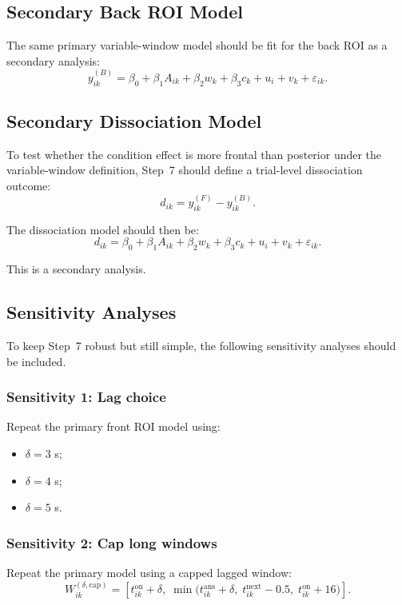 \subsection{Secondary Back ROI Model}
The same primary variable-window model should be fit for the back ROI as a secondary analysis:
\begin{equation}
y^{(B)}_{ik}
=
\beta_0
+
\beta_1 A_{ik}
+
\beta_2 w_k
+
\beta_3 c_k
+
u_i
+
v_k
+
\varepsilon_{ik}.
\end{equation}

\subsection{Secondary Dissociation Model}
To test whether the condition effect is more frontal than posterior under the variable-window definition,
Step~7 should define a trial-level dissociation outcome:
\begin{equation}
d_{ik} = y^{(F)}_{ik} - y^{(B)}_{ik}.
\end{equation}

The dissociation model should then be:
\begin{equation}
d_{ik}
=
\beta_0
+
\beta_1 A_{ik}
+
\beta_2 w_k
+
\beta_3 c_k
+
u_i
+
v_k
+
\varepsilon_{ik}.
\end{equation}

This is a secondary analysis.

\subsection{Sensitivity Analyses}
To keep Step~7 robust but still simple, the following sensitivity analyses should be included.

\subsubsection{Sensitivity 1: Lag choice}
Repeat the primary front ROI model using:
\begin{itemize}
    \item \(\delta = 3\) s;
    \item \(\delta = 4\) s;
    \item \(\delta = 5\) s.
\end{itemize}

\subsubsection{Sensitivity 2: Cap long windows}
Repeat the primary model using a capped lagged window:
\begin{equation}
W^{(\delta,\mathrm{cap})}_{ik}
=
\left[
t^{\mathrm{on}}_{ik} + \delta,\;
\min\!\bigl(t^{\mathrm{ans}}_{ik} + \delta,\; t^{\mathrm{next}}_{ik} - 0.5,\; t^{\mathrm{on}}_{ik} + 16\bigr)
\right].
\end{equation}

